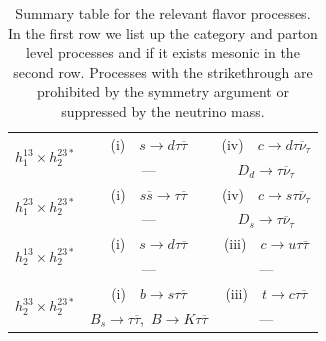 \documentclass[12pt, a4paper]{article}
\numberwithin{equation}{section} %
\newcommand{\ov}{\overline}
\newcommand{\1}{\mbox{1}\hspace{-0.25em}\mbox{l}}
\begin{document}
\begin{table}[p]
\begin{center}
{\begin{tabular}{c|c|c}
   \multirow{2}{*}{$h_1^{13}\times h_2^{23*}$} &(i)~~$s\to d\tau\ov\tau$ & (iv)~~$c\to d\tau\ov\nu_\tau$  \\ 
   &---&{$D_d\to\tau\ov\nu_\tau$}\\ \hline
   \multirow{2}{*}{$h_1^{23}\times h_2^{23*}$} &(i)~~$s\ov{s}\to\tau\ov\tau$ & (iv)~~$c\to s \tau\ov\nu_\tau$  \\ 
   &---& {$D_s\to\tau\ov\nu_\tau$} \\ \hline
   \multirow{2}{*}{$h_2^{13}\times h_2^{23*}$} &(i)~~$s\to d\tau\ov\tau$ & (iii)~~$c\to u\tau\ov\tau$  \\ 
   &---&---\\ \hline
   \multirow{2}{*}{$h_2^{33}\times$$h_2^{23*}$} &(i)~~$b\to s \tau\ov\tau$&(iii)~~$t\to c \tau\ov\tau$  \\
   &$B_s\to \tau\ov \tau$,~$B\to K \tau\ov\tau$ & ---  \\ \hline
   \end{tabular}
  }
  \caption{Summary table for the relevant flavor processes.
  In the first row we list up the category and parton level processes and if it exists mesonic in the second row.
  Processes with the strikethrough are prohibited by the symmetry argument or suppressed by the neutrino mass.
   }
  \label{Tab:ModelNRC}
\end{center}   
\vspace{-.45cm}
\end{table}

\end{document}
